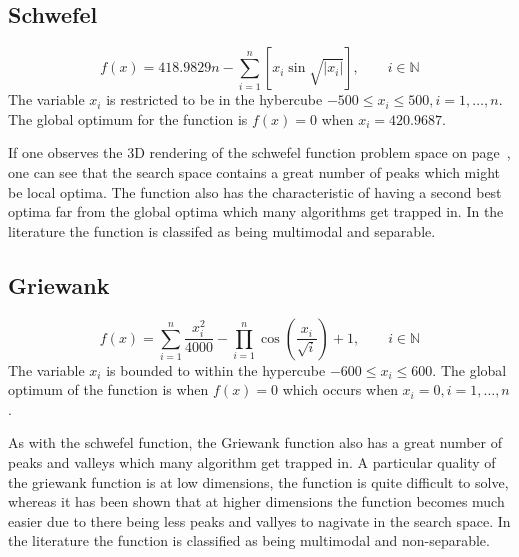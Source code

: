 \subsection{Schwefel}
\begin{equation}
	f(x) = 418.9829n - \sum^n_{i=1} [x_i\sin{\sqrt{|x_i|}}], \qquad i \in \mathbb{N}
\end{equation}
The variable $x_i$ is restricted to be in the hybercube $-500 \leq x_i \leq 500, i = 1,\ldots,n$\cite{ABCCompareStudy,numericalABC,HybridIntelliGA,DistributedHierarchicalGA,TestFunctions}. The global optimum for the function is $f(x) = 0$ when $x_i = 420.9687$\cite{ABCCompareStudy,numericalABC,HybridIntelliGA,DistributedHierarchicalGA,TestFunctions}. 

If one observes the 3D rendering of the schwefel function problem space on page~\pageref{fig:SchwefelGraph}, one can see that the search space contains a great number of peaks which might be local optima. The function also has the characteristic of having a second best optima far from the global optima which many algorithms get trapped in\cite{ABCCompareStudy,numericalABC,HybridIntelliGA,DistributedHierarchicalGA,TestFunctions}. In the literature the function is classifed as being multimodal and separable\cite{ABCCompareStudy,numericalABC,HybridIntelliGA,TestFunctions}.
\subsection{Griewank}
\begin{equation}
	f(x) = \sum^n_{i=1} \frac{x^2_i}{4000} - \prod^n_{i=1}\cos{(\frac{x_i}{\sqrt{i}})} + 1, \qquad i \in \mathbb{N}
\end{equation}
The variable $x_i$ is bounded to within the hypercube $ -600 \leq x_i \leq 600 $\cite{numericalABC,ABCCompareStudy,ARPSO,PerfABC,ContinACSTS,TestFunctions}. The global optimum of the function is when $f(x) =0$ which occurs when $ x_i = 0, i = 1, \dots, n $\cite{numericalABC,ABCCompareStudy,ARPSO,PerfABC,ContinACSTS,TestFunctions}.

As with the schwefel function, the Griewank function also has a great number of peaks and valleys which many algorithm get trapped in. A particular quality of the griewank function is at low dimensions, the function is quite difficult to solve, whereas it has been shown that at higher dimensions the function becomes much easier due to there being less peaks and vallyes to nagivate in the search space\cite{evalevoalgo,ABCCompareStudy,numericalABC,PerfABC,TestFunctions}. In the literature the function is classified as being multimodal and non-separable\cite{adaptPSO,ABCCompareStudy,numericalABC,ChaoticABC,PerfABC,TestFunctions}.
